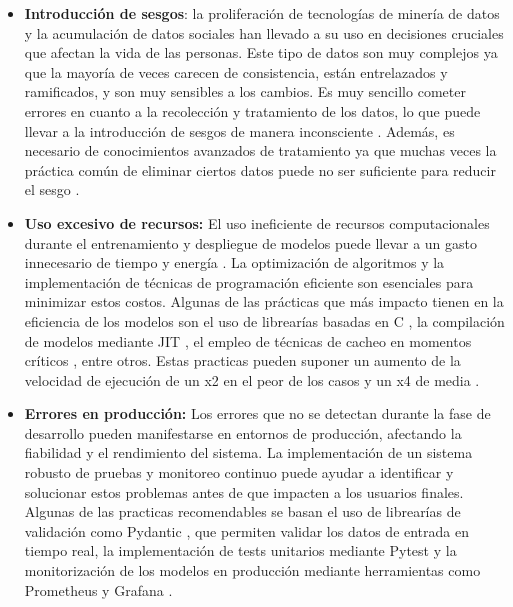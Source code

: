\begin{itemize}
    \item \textbf{Introducción de sesgos}: la proliferación de tecnologías 
    de minería de datos y la acumulación de datos sociales han llevado a su uso en 
    decisiones cruciales que afectan la vida de las personas\cite{kamishima2012fairness}. Este tipo de datos son
    muy complejos ya que la mayoría de veces carecen de consistencia, están entrelazados
    y ramificados, y son muy sensibles a los cambios. Es muy sencillo cometer errores en cuanto
    a la recolección y tratamiento de los datos, lo que puede llevar a la introducción de sesgos
    de manera inconsciente \cite{galhotra2017fairness}. Además, es necesario de conocimientos
    avanzados de tratamiento ya que muchas veces la práctica común de eliminar ciertos datos
    puede no ser suficiente para reducir el sesgo \cite{kamishima2012fairness}.
    \item \textbf{Uso excesivo de recursos:} El uso ineficiente 
    de recursos computacionales durante el entrenamiento y despliegue de modelos puede llevar a un gasto 
    innecesario de tiempo y energía \cite{Jun2010Comparative}. La optimización de algoritmos y la implementación de 
    técnicas de programación eficiente son esenciales para minimizar estos costos. Algunas de
    las prácticas que más impacto tienen en la eficiencia de los modelos son el uso de librearías
    basadas en C \cite{1182968}, la compilación de modelos mediante JIT \cite{Aycock2003Brief}, el empleo de técnicas de cacheo en
    momentos críticos \cite{lruCache}, entre otros. Estas practicas pueden suponer un aumento de la velocidad de
    ejecución de un x2 en el peor de los casos y un x4 de media \cite{Jun2010Comparative}. 
    \item \textbf{Errores en producción:} Los errores que no se detectan durante 
    la fase de desarrollo pueden manifestarse en entornos de producción, afectando la fiabilidad 
    y el rendimiento del sistema. La implementación de un sistema robusto de pruebas y monitoreo 
    continuo puede ayudar a identificar y solucionar estos problemas antes de que impacten a los 
    usuarios finales. Algunas de las practicas recomendables se basan el uso de librearías de validación como
    Pydantic \cite{pydantic}, que permiten validar los datos de entrada en tiempo real,
    la implementación de tests unitarios mediante Pytest \cite{Pytest} y la monitorización
    de los modelos en producción mediante herramientas como Prometheus \cite{prometheus} y Grafana \cite{grafana}.

\end{itemize}

 
\pagebreak